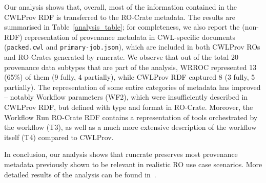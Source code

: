 \documentclass[10pt,letterpaper]{article}
\begin{document}
Our analysis shows that, overall, most of the information contained in the CWLProv RDF is transferred to the RO-Crate metadata.
The results are summarised in Table~\ref{analysis_table};
for completeness, we also report the (non-RDF) representation of provenance metadata in CWL-specific documents (\texttt{packed.cwl} and \texttt{primary-job.json}), which are included in both CWLProv ROs and RO-Crates generated by runcrate.
%
We observe that out of the total 20 provenance data subtypes that are part of the analysis, WRROC represented 13 (65\%) of them (9 fully, 4 partially), while CWLProv RDF captured 8 (3 fully, 5 partially).  The representation of some entire categories of metadata has improved -- notably Workflow parameters (WF2), which were insufficiently described in CWLProv RDF, but defined with type and format in RO-Crate.
Moreover, the Workflow Run RO-Crate RDF contains a representation of tools orchestrated by the workflow (T3), as well as a much more extensive description of the workflow itself (T4) compared to CWLProv.

In conclusion, our analysis shows that runcrate preserves most provenance metadata previously shown to be relevant in realistic RO use case scenarios.
More detailed results of the analysis can be found in~\cite{de Wit 2024}. %
\end{document}

